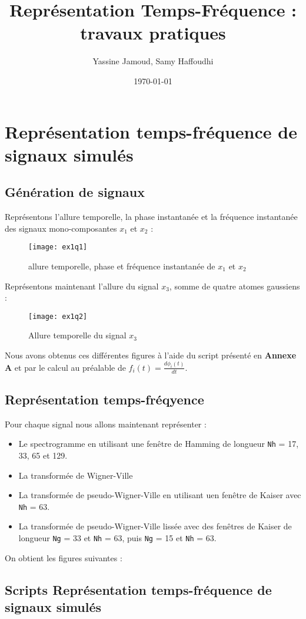 \documentclass[12pt,a4paper,titlepage]{article}
\title{Représentation  Temps-Fréquence : travaux pratiques}
\author{Yassine Jamoud, Samy Haffoudhi}
\date{\today}
\begin{document}
\maketitle

\setcounter{section}{1}

\section{Représentation temps-fréquence de signaux simulés}

\subsection{Génération de signaux}

Représentons l'allure temporelle, la phase instantanée et la fréquence instantanée des signaux
mono-composantes $x_1$ et $x_2$ :

\begin{figure}[H]
    \caption{allure temporelle, phase et fréquence instantanée de $x_1$ et $x_2$}
    \texttt{[image: ex1q1]}
    \centering
\end{figure}

Représentons maintenant l'allure du signal $x_3$, somme de quatre atomes gaussiens :

\begin{figure}[H]
    \caption{Allure temporelle du signal $x_3$}
    \texttt{[image: ex1q2]}
    \centering
\end{figure}

Nous avons obtenus ces différentes figures à l'aide du script présenté en \textbf{Annexe A} et par le calcul
au préalable de $f_i(t) = \frac{d\phi_i(t)}{dt}$.

\subsection{Représentation temps-fréqyence}

Pour chaque signal nous allons maintenant représenter :

\begin{itemize}
    \item{Le spectrogramme en utilisant une fenêtre de Hamming de longueur \texttt{Nh} = 17, 33, 65
        et 129.}
    \item{La transformée de Wigner-Ville}
    \item{La transformée de pseudo-Wigner-Ville en utilisant uen fenêtre de Kaiser avec \texttt{Nh}
        = 63.}
    \item{La transformée de pseudo-Wigner-Ville lissée avec des fenêtres de Kaiser de longueur
        \texttt{Ng} = 33 et \texttt{Nh} = 63, puis \texttt{Ng} = 15 et \texttt{Nh} = 63.}
\end{itemize}

On obtient les figures suivantes :

\begin{appendices}

    \section{Scripts Représentation temps-fréquence de signaux simulés}

    

\end{appendices}
\end{document}
